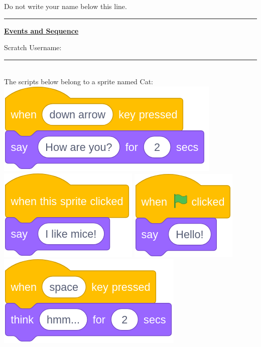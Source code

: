 \documentclass[letterpaper,12pt]{article}
\begin{document}
\noindent Do not write your name below this line. \\
\noindent \hrule
\begin{center}
{\Large \textbf{\underline{Events and Sequence}}}
\end{center}
Scratch Username: \rule{4cm}{0.4pt}

\noindent \dotfill \\

\noindent The scripts below belong to a sprite named Cat: \\

\includegraphics[scale=.3]{q1_script0.png} \hspace{1cm}
\includegraphics[scale=.3]{q1_script1.png} \hspace{1cm}
\includegraphics[scale=.3]{q1_script2.png} \hspace{1cm}
\includegraphics[scale=.3]{q1_script3.png} \hspace{1cm} \\
\end{document}

